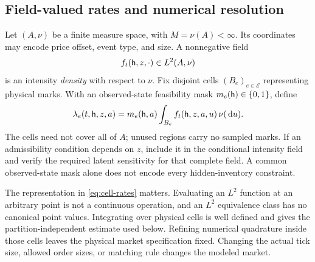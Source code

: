\subsection{Field-valued rates and numerical resolution}
Let $(A,\nu)$ be a finite measure space, with $M=\nu(A)<\infty$. Its coordinates may encode price offset, event type, and size. A nonnegative field
\[
 f_t(\mathsf h,z,\cdot)\in L^2(A,\nu)
\]
is an intensity \emph{density} with respect to $\nu$. Fix disjoint cells $(B_e)_{e\in\mathcal E}$ representing physical marks. With an observed-state feasibility mask $m_e(\mathsf h)\in\{0,1\}$, define
\begin{equation}\label{eq:cell-rates}
 \lambda_e(t,\mathsf h,z,a)
 =m_e(\mathsf h,a)\int_{B_e}f_t(\mathsf h,z,a,u)\,\nu(\,\mathrm d u).
\end{equation}
The cells need not cover all of $A$; unused regions carry no sampled marks. If an admissibility condition depends on $z$, include it in the conditional intensity field and verify the required latent sensitivity for that complete field. A common observed-state mask alone does not encode every hidden-inventory constraint.

The representation in \eqref{eq:cell-rates} matters. Evaluating an $L^2$ function at an arbitrary point is not a continuous operation, and an $L^2$ equivalence class has no canonical point values. Integrating over physical cells is well defined and gives the partition-independent estimate used below. Refining numerical quadrature inside those cells leaves the physical market specification fixed. Changing the actual tick size, allowed order sizes, or matching rule changes the modeled market.
